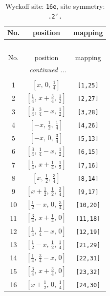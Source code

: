 \documentclass[fleqn,8pt]{jsarticle}
\begin{document}
\renewcommand{\arraystretch}{1.2}
\begin{longtable}{ccc}
\caption{Wyckoff site: {\tt 16e}, site symmetry: {\tt .2'.}}
 \\
 \hline \hline
No. & position & mapping \\ \hline \endfirsthead

\multicolumn{2}{l}{\tablename\ \thetable{}} \\
 \hline \hline
No. & position & mapping \\ \hline \endhead

 \hline \hline
\multicolumn{2}{r}{\footnotesize\it continued ...} \\ \endfoot

 \hline \hline
\multicolumn{2}{r}{} \\ \endlastfoot

1 & $\left[ x,\, 0,\, \frac{1}{4} \right]$ & {\tt [1,25]} \\ \hline
2 & $\left[ \frac{1}{4},\, x + \frac{3}{4},\, \frac{1}{2} \right]$ & {\tt [2,27]} \\ \hline
3 & $\left[ \frac{3}{4},\, \frac{3}{4} - x,\, \frac{1}{2} \right]$ & {\tt [3,28]} \\ \hline
4 & $\left[ - x,\, \frac{1}{2},\, \frac{1}{4} \right]$ & {\tt [4,26]} \\ \hline
5 & $\left[ - x,\, 0,\, \frac{3}{4} \right]$ & {\tt [5,13]} \\ \hline
6 & $\left[ \frac{3}{4},\, \frac{1}{4} - x,\, \frac{1}{2} \right]$ & {\tt [6,15]} \\ \hline
7 & $\left[ \frac{1}{4},\, x + \frac{1}{4},\, \frac{1}{2} \right]$ & {\tt [7,16]} \\ \hline
8 & $\left[ x,\, \frac{1}{2},\, \frac{3}{4} \right]$ & {\tt [8,14]} \\ \hline
9 & $\left[ x + \frac{1}{2},\, \frac{1}{2},\, \frac{3}{4} \right]$ & {\tt [9,17]} \\ \hline
10 & $\left[ \frac{1}{2} - x,\, 0,\, \frac{3}{4} \right]$ & {\tt [10,20]} \\ \hline
11 & $\left[ \frac{3}{4},\, x + \frac{1}{4},\, 0 \right]$ & {\tt [11,18]} \\ \hline
12 & $\left[ \frac{1}{4},\, \frac{1}{4} - x,\, 0 \right]$ & {\tt [12,19]} \\ \hline
13 & $\left[ \frac{1}{2} - x,\, \frac{1}{2},\, \frac{1}{4} \right]$ & {\tt [21,29]} \\ \hline
14 & $\left[ \frac{1}{4},\, \frac{3}{4} - x,\, 0 \right]$ & {\tt [22,31]} \\ \hline
15 & $\left[ \frac{3}{4},\, x + \frac{3}{4},\, 0 \right]$ & {\tt [23,32]} \\ \hline
16 & $\left[ x + \frac{1}{2},\, 0,\, \frac{1}{4} \right]$ & {\tt [24,30]} \\
\end{longtable}
\end{document}
